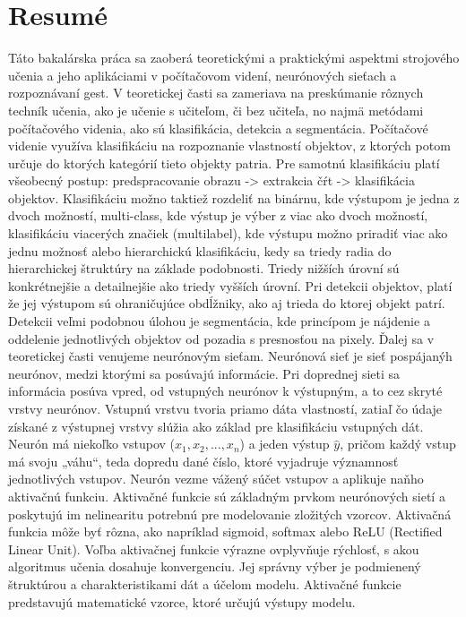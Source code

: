  \chapter{Resumé}
 \label{ch:resume}
Táto bakalárska práca sa zaoberá teoretickými a praktickými aspektmi strojového učenia a jeho aplikáciami v počítačovom videní, neurónových sieťach a rozpoznávaní gest. V teoretickej časti sa zameriava na preskúmanie rôznych techník učenia, ako je učenie s učiteľom, či bez učiteľa, no najmä metódami počítačového videnia, ako sú klasifikácia, detekcia a segmentácia.\newline
 Počítačové videnie využíva klasifikáciu na rozpoznanie vlastností objektov, z ktorých potom určuje do ktorých kategórií tieto objekty patria. Pre samotnú klasifikáciu platí všeobecný postup: predspracovanie obrazu -> extrakcia čŕt -> klasifikácia objektov. Klasifikáciu možno taktiež rozdeliť na binárnu, kde výstupom je jedna z dvoch možností, multi-class, kde výstup je výber z viac ako dvoch možností, klasifikáciu viacerých značiek (multilabel), kde výstupu možno priradiť viac ako jednu možnosť alebo hierarchickú klasifikáciu, kedy sa triedy radia do hierarchickej štruktúry na základe podobnosti. Triedy nižších úrovní sú konkrétnejšie a detailnejšie ako triedy vyšších úrovní. Pri detekcii objektov, platí že jej výstupom sú ohraničujúce obdĺžniky, ako aj trieda do ktorej objekt patrí. Detekcii veľmi podobnou úlohou je segmentácia, kde princípom je nájdenie a oddelenie jednotlivých objektov od pozadia s presnosťou na pixely.\newline
Ďalej sa v teoretickej časti venujeme neurónovým sieťam. Neurónová sieť je sieť pospájanýh neurónov, medzi ktorými sa posúvajú informácie.	Pri doprednej sieti sa informácia posúva vpred, od vstupných neurónov k výstupným, a to cez skryté vrstvy neurónov. Vstupnú vrstvu tvoria priamo dáta vlastností, zatiaľ čo údaje získané z výstupnej vrstvy slúžia ako základ pre klasifikáciu vstupných dát. Neurón má niekoľko vstupov  ($x_1, x_2, ..., x_n$) a jeden výstup $\hat{y}$, pričom každý vstup má svoju „váhu“, teda dopredu dané číslo, ktoré vyjadruje významnosť jednotlivých vstupov. Neurón vezme vážený súčet vstupov a aplikuje naňho aktivačnú funkciu. Aktivačné funkcie sú základným prvkom neurónových sietí a poskytujú im nelinearitu potrebnú pre modelovanie zložitých vzorcov. Aktivačná funkcia môže byť rôzna, ako napríklad sigmoid, softmax alebo ReLU (Rectified Linear Unit). Voľba aktivačnej funkcie výrazne ovplyvňuje rýchlosť, s akou algoritmus učenia dosahuje konvergenciu. Jej správny výber je podmienený štruktúrou a charakteristikami dát a účelom modelu. Aktivačné funkcie predstavujú matematické vzorce, ktoré určujú výstupy modelu. \newline
																																			


